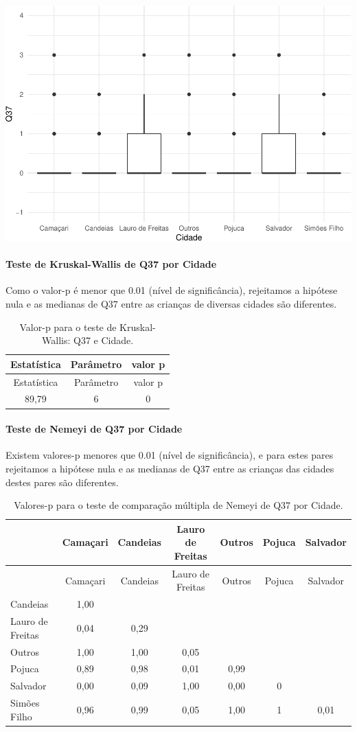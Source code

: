 \documentclass[]{article}
\let\oldparagraph\paragraph
\renewcommand{\paragraph}[1]{\oldparagraph{#1}\mbox{}}
\begin{document}
\begin{center}\includegraphics[width=0.75\linewidth]{relatorio_covid19_files/figure-latex/unnamed-chunk-1374-1} \end{center}

\hypertarget{teste-de-kruskal-wallis-de-q37-por-cidade}{%
\paragraph{Teste de Kruskal-Wallis de Q37 por Cidade}\label{teste-de-kruskal-wallis-de-q37-por-cidade}}

Como o valor-p é menor que 0.01 (nível de significância), rejeitamos a hipótese nula e as medianas de Q37 entre as crianças de diversas cidades são diferentes.

\begin{longtable}[]{@{}ccc@{}}
\caption{\label{tab:unnamed-chunk-1376}Valor-p para o teste de Kruskal-Wallis: Q37 e Cidade.}\tabularnewline
\toprule
Estatística & Parâmetro & valor p\tabularnewline
\midrule
\endfirsthead
\toprule
Estatística & Parâmetro & valor p\tabularnewline
\midrule
\endhead
89,79 & 6 & 0\tabularnewline
\bottomrule
\end{longtable}

\hypertarget{teste-de-nemeyi-de-q37-por-cidade}{%
\paragraph{Teste de Nemeyi de Q37 por Cidade}\label{teste-de-nemeyi-de-q37-por-cidade}}

Existem valores-p menores que 0.01 (nível de significância), e para estes pares rejeitamos a hipótese nula e as medianas de Q37 entre as crianças das cidades destes pares são diferentes.

\begin{longtable}[]{@{}lcccccc@{}}
\caption{\label{tab:unnamed-chunk-1378}Valores-p para o teste de comparação múltipla de Nemeyi de Q37 por Cidade.}\tabularnewline
\toprule
& Camaçari & Candeias & Lauro de Freitas & Outros & Pojuca & Salvador\tabularnewline
\midrule
\endfirsthead
\toprule
& Camaçari & Candeias & Lauro de Freitas & Outros & Pojuca & Salvador\tabularnewline
\midrule
\endhead
Candeias & 1,00 & & & & &\tabularnewline
Lauro de Freitas & 0,04 & 0,29 & & & &\tabularnewline
Outros & 1,00 & 1,00 & 0,05 & & &\tabularnewline
Pojuca & 0,89 & 0,98 & 0,01 & 0,99 & &\tabularnewline
Salvador & 0,00 & 0,09 & 1,00 & 0,00 & 0 &\tabularnewline
Simões Filho & 0,96 & 0,99 & 0,05 & 1,00 & 1 & 0,01\tabularnewline
\bottomrule
\end{longtable}
\end{document}
